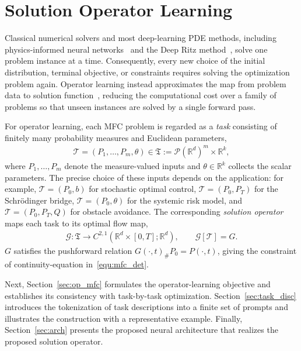 \documentclass[preprint]{elsarticle}
\newcommand{\R}{\mathbb{R}}
\newcommand{\pr}{\mathscr{P}}           %
\newcommand{\sT}{\mathcal{T}}
\newcommand{\sG}{\mathcal{G}}
\begin{document}
\section{Solution Operator Learning}\label{sec:sol}

Classical numerical solvers and most deep-learning PDE methods, including physics-informed neural networks~\cite{raissi2019pinn,sirignano2018dgm} and the Deep Ritz method~\cite{weinan2018deepritz}, solve one problem instance at a time. Consequently, every new choice of the initial distribution, terminal objective, or constraints requires solving the optimization problem again. Operator learning instead approximates the map from problem data to solution function~\cite{lu2021deeponet,li2021fno}, reducing the computational cost over a family of problems so that unseen instances are solved by a single forward pass.

For operator learning, each MFC problem is regarded as a \emph{task} consisting of finitely many probability measures and Euclidean parameters,
\begin{align}
    \sT=(P_1,\ldots,P_m,\theta)
    \in
    \mathfrak T:=\pr(\R^d)^m\times\R^k,
    \label{equ:task_space}
\end{align}
where $P_1,\ldots,P_m$ denote the measure-valued inputs and $\theta\in\R^k$ collects the scalar parameters. The precise choice of these inputs depends on the application: for example, $\sT=(P_0,b)$ for stochastic optimal control, $\sT=(P_0,P_T)$ for the Schr\"odinger bridge, $\sT=(P_0,\theta)$ for the systemic risk model, and $\sT=(P_0,P_T,Q)$ for obstacle avoidance. The corresponding \emph{solution operator} maps each task to its optimal flow map,
\begin{align}
    \sG:\mathfrak T
    \longrightarrow
    C^{2,1}(\R^d\times[0,T];\R^d),
    \qquad
    \sG[\sT]=G.
    \label{equ:sol_op_def}
\end{align}
$G$ satisfies the pushforward relation $G(\cdot,t)_{\#}P_0 = P(\cdot,t)$, giving the constraint of continuity-equation in~\eqref{equ:mfc_det}.

Next, Section~\ref{sec:op_mfc} formulates the operator-learning objective and establishes its consistency with task-by-task optimization. Section~\ref{sec:task_disc} introduces the tokenization of task descriptions into a finite set of prompts and illustrates the construction with a representative example. Finally, Section~\ref{sec:arch} presents the proposed neural architecture that realizes the proposed solution operator.
\end{document}
